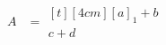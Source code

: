 \begin{align}
  A &= \begin{multlined}[t][4cm]
    [a]_1 + b \\
    c + d
  \end{multlined}
\end{align}
